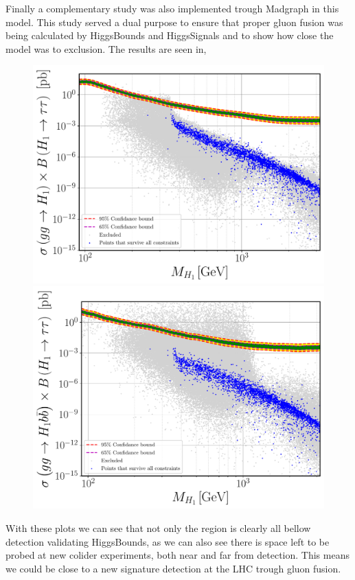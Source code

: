 Finally a complementary study was also implemented trough Madgraph in this model. 
%
This study served a dual purpose to ensure that proper gluon fusion was being calculated by HiggsBounds and HiggsSignals and to show how close the model was to exclusion. The results are seen in, 
%
\begin{figure}[H]
	\centering
	\includegraphics[width=.49\textwidth]{Images/3HDM/Xsec/Xsec_1_Grey_tight.pdf}	%
	\includegraphics[width=.49\textwidth]{Images/3HDM/Xsec/Xsec_3_Grey_Thight.pdf}
	\caption{}
	\label{}
\end{figure}	
%
With these plots we can see that not only the region is clearly all bellow detection validating HiggsBounds, as we can also see there is space left to be probed at new colider experiments, both near and far from detection. 
%
This means we could be close to a new signature detection at the LHC trough gluon fusion.  



